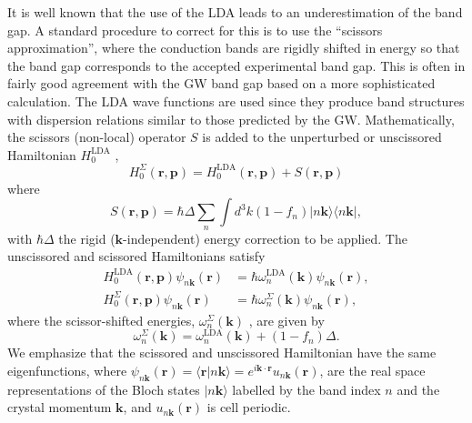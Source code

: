 \documentclass[floatfix,prb,aps,superscriptaddress,showpacs,letterpaper]{revtex4}
\begin{document}
It is well known that the use of the LDA
leads to an underestimation of the band gap. A standard
procedure to correct for this is to
use the ``scissors approximation'', where the 
conduction bands are rigidly shifted in energy so that the band gap 
corresponds to the accepted 
experimental band gap.\cite{levinePRL89,levinePRL91,delsolePRB93} 
This is often in fairly good agreement with the GW
band gap based on a more sophisticated calculation.\cite{hybertsenPRB86}
The LDA wave functions are used since they produce band
structures with dispersion relations similar to those predicted by the GW.
Mathematically, the scissors (non-local) operator 
$S$ is added to the unperturbed or unscissored Hamiltonian $H^{\mathrm{LDA}}_{0}$ ,
\begin{equation*}
H^\Sigma_{0}(\mathbf{r},\mathbf{p})=H^{\mathrm{LDA}}_{0}(\mathbf{r},\mathbf{p})+S(\mathbf{r},\mathbf{p})
\end{equation*}
where 
\begin{equation}
S(\mathbf{r},\mathbf{p})=\hbar \Delta\sum_{n}\int d^{3}k(1-f_{n})
|n\mathbf{k}\rangle\langle n\mathbf{k}|,
\label{hats}
\end{equation}
with $\hbar \Delta$  the rigid ($\mathbf{k}$-independent) energy correction to be
applied. 
The unscissored and scissored Hamiltonians satisfy 
\begin{align*}
H^{\mathrm{LDA}}_{0}(\mathbf{r},\mathbf{p})\psi _{n\mathbf{k}}(\mathbf{r}) &=
\hbar \omega^{\mathrm{LDA}}_{n}(\mathbf{k})\psi _{n\mathbf{k}}(\mathbf{r}),\label{hamils} \\
H_{0}^\Sigma (\mathbf{r},\mathbf{p})\psi _{n\mathbf{k}}(\mathbf{r}) &=
\hbar \omega_{n}^\Sigma(\mathbf{k})\psi _{n\mathbf{k}}(\mathbf{r}),
\end{align*}
where the scissor-shifted energies, 
$\omega_{n}^\Sigma(\mathbf{k})$ , are given by
\begin{equation*}
\omega_{n}^\Sigma(\mathbf{k})=\omega^\mathrm{LDA}_{n}(\mathbf{k})+(1-f_{n})\Delta.
\end{equation*}
We emphasize that the scissored and unscissored Hamiltonian 
have the same eigenfunctions, where
$\psi_{n\mathbf{k}}(\mathbf{r})=\langle\mathbf{r}|n\mathbf{k}\rangle=e^{i\mathbf{k}\cdot\mathbf{r}}u_{n\mathbf{k}}(\mathbf{r})$,
are the real space representations of the Bloch states $| n\mathbf{k}\rangle$ labelled 
by the band index $n$ and the crystal momentum $\mathbf{k}$, and $u_{n\mathbf{k}}(\mathbf{r})$
is cell periodic. 
\end{document}
